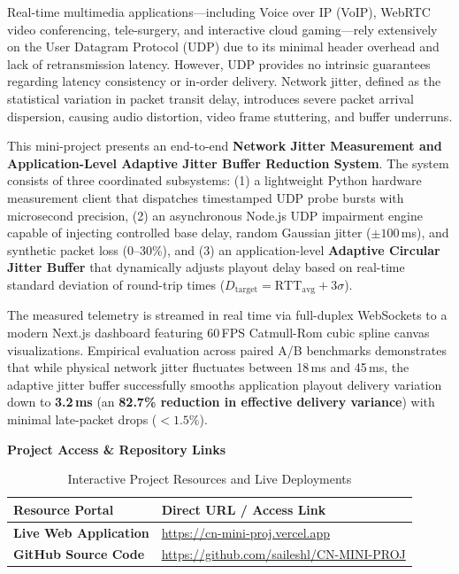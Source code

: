 \documentclass[12pt, a4paper]{report}
\begin{document}
Real-time multimedia applications---including Voice over IP (VoIP), WebRTC video conferencing, tele-surgery, and interactive cloud gaming---rely extensively on the User Datagram Protocol (UDP) due to its minimal header overhead and lack of retransmission latency. However, UDP provides no intrinsic guarantees regarding latency consistency or in-order delivery. Network jitter, defined as the statistical variation in packet transit delay, introduces severe packet arrival dispersion, causing audio distortion, video frame stuttering, and buffer underruns.

This mini-project presents an end-to-end \textbf{Network Jitter Measurement and Application-Level Adaptive Jitter Buffer Reduction System}. The system consists of three coordinated subsystems: (1) a lightweight Python hardware measurement client that dispatches timestamped UDP probe bursts with microsecond precision, (2) an asynchronous Node.js UDP impairment engine capable of injecting controlled base delay, random Gaussian jitter ($\pm 100$\,ms), and synthetic packet loss (0--30\%), and (3) an application-level \textbf{Adaptive Circular Jitter Buffer} that dynamically adjusts playout delay based on real-time standard deviation of round-trip times ($D_{\text{target}} = \text{RTT}_{\text{avg}} + 3\sigma$).

The measured telemetry is streamed in real time via full-duplex WebSockets to a modern Next.js dashboard featuring 60\,FPS Catmull-Rom cubic spline canvas visualizations. Empirical evaluation across paired A/B benchmarks demonstrates that while physical network jitter fluctuates between 18\,ms and 45\,ms, the adaptive jitter buffer successfully smooths application playout delivery variation down to \textbf{3.2\,ms} (an \textbf{82.7\% reduction in effective delivery variance}) with minimal late-packet drops ($<1.5\%$).

\vspace{0.5cm}
\noindent\textbf{\large Project Access \& Repository Links}
\vspace{0.2cm}

\begin{table}[H]
\centering
\begin{tabularx}{\textwidth}{|l|L|}
\hline
\textbf{Resource Portal} & \textbf{Direct URL / Access Link} \\
\hline
\textbf{Live Web Application} & \url{https://cn-mini-proj.vercel.app} \\
\hline
\textbf{GitHub Source Code} & \url{https://github.com/saileshl/CN-MINI-PROJ} \\
\hline
\end{tabularx}
\caption{Interactive Project Resources and Live Deployments}
\end{table}
\end{document}
